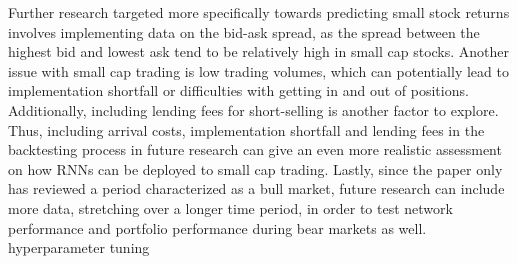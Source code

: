 \indent\newline 
Further research targeted more specifically towards predicting small stock returns involves implementing data on the bid-ask spread, as the spread between the highest bid and lowest ask tend to be relatively high in small cap stocks. Another issue with small cap trading is low trading volumes, which can potentially lead to implementation shortfall or difficulties with getting in and out of positions. Additionally, including lending fees for short-selling is another factor to explore. Thus, including arrival costs, implementation shortfall and lending fees in the backtesting process in future research can give an even more realistic assessment on how RNNs can be deployed to small cap trading. Lastly, since the paper only has reviewed a period characterized as a bull market,  future research can include more data, stretching over a longer time period, in order to test network performance and portfolio performance during bear markets as well.   hyperparameter tuning